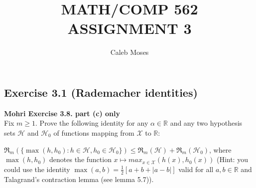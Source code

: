 \documentclass[
10pt, %
a4paper, %
oneside, %
headinclude,footinclude, %
BCOR5mm, %
]{scrartcl}
\author{\spacedlowsmallcaps{Caleb Moses*}} %
\date{} %
\title{MATH/COMP 562 ASSIGNMENT 3}
\author{Caleb Moses}
\newenvironment{problem}[2][]
               { \begin{mdframed}[backgroundcolor=gray!20] \textbf{#1 #2} \\}
               {  \end{mdframed}}
\begin{document}
\maketitle



\subsection*{Exercise 3.1 (Rademacher identities)}
\begin{problem}{Mohri Exercise 3.8. part (c) only}
Fix $m \geq 1$. Prove the following identity for any $\alpha \in \mathbb{R}$ and any two hypothesis sets $\mathcal{H}$ and $\mathcal{H}_0$ of functions mapping from $\mathcal{X}$ to $\mathbb{R}$:

$\mathfrak{R}_m(\{\max(h, h_0 ): h \in \mathcal{H}, h_0 \in \mathcal{H}_0 \}) \leq \mathfrak{R}_m (\mathcal{H}) + \mathfrak{R}_m (\mathcal{H}_0)$, where $\max(h, h_0 )$ denotes the function $x \mapsto max_{x\in \mathcal{X}} (h(x), h_0 (x))$ (Hint: you could use the identity $\max(a, b) = \frac{1}{2} [a + b + |a - b|]$ valid for all $a, b \in \mathbb{R}$ and Talagrand’s contraction lemma (see lemma 5.7)).
\end{problem}
\end{document}
